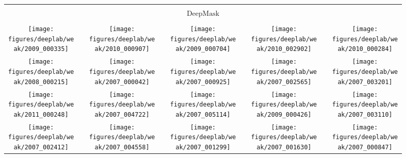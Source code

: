 \documentclass[10pt,english,british,twocolumn]{article}
\providecommand{\tabularnewline}{\\}
\begin{document}
\begin{figure*}[t]
{\begin{tabular}[b]{ccccccccc}
\vspace{0.1em}
 &  &  &  &  &  &  &  & \tabularnewline
\multicolumn{9}{c}{$\mathrm{DeepMask}$}\tabularnewline
\vspace{1em}
 &  &  &  &  &  &  &  & \tabularnewline
\texttt{[image: figures/deeplab/weak/2009\_000335]} & \hspace*{0.1em} & \texttt{[image: figures/deeplab/weak/2010\_000907]} & \hspace*{0.1em} & \texttt{[image: figures/deeplab/weak/2009\_000704]} & \hspace*{0.1em} & \texttt{[image: figures/deeplab/weak/2010\_002902]} & \hspace*{0.1em} & \texttt{[image: figures/deeplab/weak/2010\_000284]}\tabularnewline
\texttt{[image: figures/deeplab/weak/2008\_000215]} & \hspace*{0.1em} & \texttt{[image: figures/deeplab/weak/2007\_000042]} & \hspace*{0.1em} & \texttt{[image: figures/deeplab/weak/2007\_000925]} & \hspace*{0.1em} & \texttt{[image: figures/deeplab/weak/2007\_002565]} & \hspace*{0.1em} & \texttt{[image: figures/deeplab/weak/2007\_003201]}\tabularnewline
\texttt{[image: figures/deeplab/weak/2011\_000248]} & \hspace*{0.1em} & \texttt{[image: figures/deeplab/weak/2007\_004722]} & \hspace*{0.1em} & \texttt{[image: figures/deeplab/weak/2007\_005114]} & \hspace*{0.1em} & \texttt{[image: figures/deeplab/weak/2009\_000426]} & \hspace*{0.1em} & \texttt{[image: figures/deeplab/weak/2007\_003110]}\tabularnewline
\texttt{[image: figures/deeplab/weak/2007\_002412]} & \hspace*{0.1em} & \texttt{[image: figures/deeplab/weak/2007\_004558]} & \hspace*{0.1em} & \texttt{[image: figures/deeplab/weak/2007\_001299]} & \hspace*{0.1em} & \texttt{[image: figures/deeplab/weak/2007\_001630]} & \hspace*{0.1em} & \texttt{[image: figures/deeplab/weak/2007\_000847]}\tabularnewline

\end{tabular}}
\end{figure*}
\end{document}
